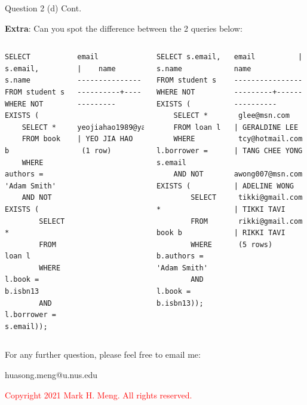 \begin{frame}[fragile]{Question 2 (d) Cont.}

\textbf{Extra}: Can you spot the difference between the 2 queries below:
\begin{columns}[t]
	
\begin{lstlisting}
SELECT s.email, s.name
FROM student s
WHERE NOT EXISTS (
	SELECT * 
	FROM book b
	WHERE authors = 'Adam Smith' 
	AND NOT EXISTS (
		SELECT * 
		FROM loan l
		WHERE l.book = b.isbn13 
		AND l.borrower = s.email));
\end{lstlisting}
\begin{lstlisting}[style=terminial-tiny]	
          email          |    name
-------------------------+-------------
 yeojiahao1989@yahoo.com | YEO JIA HAO
 (1 row)	
\end{lstlisting}
\begin{lstlisting}
SELECT s.email, s.name
FROM student s
WHERE NOT EXISTS (
	SELECT * 
	FROM loan l
	WHERE l.borrower = s.email
	AND NOT EXISTS (
		SELECT *
		FROM book b
		WHERE b.authors = 'Adam Smith'
		AND l.book = b.isbn13));
\end{lstlisting}

\begin{lstlisting}[style=terminial-tiny]
          email          |      name
-------------------------+----------------
 glee@msn.com            | GERALDINE LEE
 tcy@hotmail.com         | TANG CHEE YONG
 awong007@msn.com        | ADELINE WONG
 tikki@gmail.com         | TIKKI TAVI
 rikki@gmail.com         | RIKKI TAVI
 (5 rows)
\end{lstlisting}
\end{columns}
\end{frame}
\begin{frame}{}
\centering  
For any further question, please feel free to email me:\vspace{10pt}

huasong.meng@u.nus.edu \vspace{20pt}

\begin{tcolorbox}
	\begin{center}
		\textcolor{red}{Copyright 2021 Mark H. Meng. All rights reserved.}
	\end{center}
\end{tcolorbox}

\end{frame}